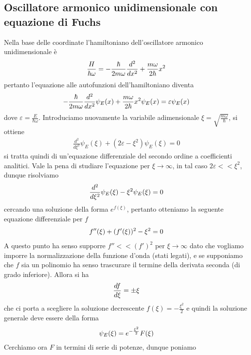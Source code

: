 \documentclass{article}
\begin{document}
\subsection{Oscillatore armonico unidimensionale con equazione di Fuchs}
Nella base delle coordinate l'hamiltoniano dell'oscillatore armonico unidimensionale è
\begin{gather}
    \frac{H}{\hbar\omega} = -\frac{\hbar}{2m\omega}\frac{d^2}{dx^2} + \frac{m\omega}{2\hbar}x^2 \notag
\end{gather}
pertanto l'equazione alle autofunzioni dell'hamiltoniano diventa
\begin{gather}
    -\frac{\hbar}{2m\omega}\frac{d^2}{dx^2}\psi_E(x) + \frac{m\omega}{2\hbar}x^2\psi_E(x) = \varepsilon\psi_E(x) \notag
\end{gather}
dove $\varepsilon = \frac{E}{\hbar\omega}$. Introduciamo nuovamente la variabile adimensionale $\xi = \sqrt{\frac{m\omega}{\hbar}}$, si ottiene
\begin{gather}
    \frac{d^2}{d\xi^2}\psi_E(\xi) + (2\varepsilon - \xi^2)\psi_E(\xi) = 0 \tag{4.2.1}
\end{gather}
si tratta quindi di un'equazione differenziale del secondo ordine a coefficienti analitici. Vale la pena di studiare l'equazione per $\xi \rightarrow \infty$, in tal caso $2\varepsilon << \xi^2$, dunque risolviamo
\begin{gather}
    \frac{d^2}{d\xi^2}\psi_E(\xi) - \xi^2\psi_E(\xi) = 0 \notag
\end{gather}
cercando una soluzione della forma $e^{f(\xi)}$, pertanto otteniamo la seguente equazione differenziale per $f$
\begin{gather}
    f''(\xi) + (f'(\xi))^2 - \xi^2 = 0 \notag
\end{gather}
A questo punto ha senso supporre $f'' << (f')^2$ per $\xi \rightarrow \infty$ dato che vogliamo imporre la normalizzazione della funzione d'onda (stati legati), e se supponiamo che $f$ sia un polinomio ha senso trascurare il termine della derivata seconda (di grado inferiore). Allora si ha
\begin{gather}
    \frac{df}{d\xi} = \pm\xi \notag
\end{gather}
che ci porta a scegliere la soluzione decrescente $f(\xi) = -\frac{\xi^2}{2}$ e quindi la soluzione generale deve essere della forma
\begin{gather}
    \psi_E(\xi) = e^{-\frac{\xi^2}{2}}F(\xi) \notag
\end{gather}
Cerchiamo ora $F$ in termini di serie di potenze, dunque poniamo
\end{document}
